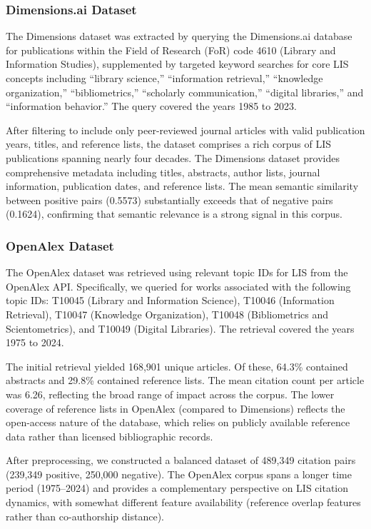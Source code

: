 \documentclass[12pt,a4paper]{article}
\begin{document}
\subsubsection{Dimensions.ai Dataset}

The Dimensions dataset was extracted by querying the Dimensions.ai database for publications within the Field of Research (FoR) code 4610 (Library and Information Studies), supplemented by targeted keyword searches for core LIS concepts including ``library science,'' ``information retrieval,'' ``knowledge organization,'' ``bibliometrics,'' ``scholarly communication,'' ``digital libraries,'' and ``information behavior.'' The query covered the years 1985 to 2023.

After filtering to include only peer-reviewed journal articles with valid publication years, titles, and reference lists, the dataset comprises a rich corpus of LIS publications spanning nearly four decades. The Dimensions dataset provides comprehensive metadata including titles, abstracts, author lists, journal information, publication dates, and reference lists. The mean semantic similarity between positive pairs (0.5573) substantially exceeds that of negative pairs (0.1624), confirming that semantic relevance is a strong signal in this corpus.

\subsubsection{OpenAlex Dataset}

The OpenAlex dataset was retrieved using relevant topic IDs for LIS from the OpenAlex API. Specifically, we queried for works associated with the following topic IDs: T10045 (Library and Information Science), T10046 (Information Retrieval), T10047 (Knowledge Organization), T10048 (Bibliometrics and Scientometrics), and T10049 (Digital Libraries). The retrieval covered the years 1975 to 2024.

The initial retrieval yielded 168,901 unique articles. Of these, 64.3\% contained abstracts and 29.8\% contained reference lists. The mean citation count per article was 6.26, reflecting the broad range of impact across the corpus. The lower coverage of reference lists in OpenAlex (compared to Dimensions) reflects the open-access nature of the database, which relies on publicly available reference data rather than licensed bibliographic records.

After preprocessing, we constructed a balanced dataset of 489,349 citation pairs (239,349 positive, 250,000 negative). The OpenAlex corpus spans a longer time period (1975--2024) and provides a complementary perspective on LIS citation dynamics, with somewhat different feature availability (reference overlap features rather than co-authorship distance).
\end{document}
